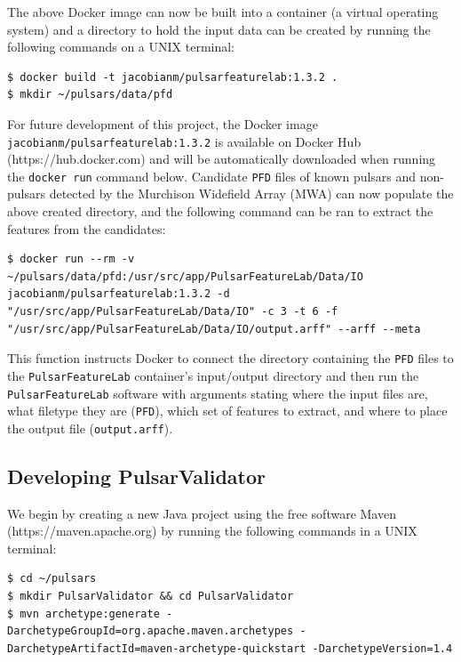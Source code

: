 \documentclass{article}
\begin{document}
\begin{appendices}
\begin{subappendices}
        The above Docker image can now be built into a container (a virtual operating system) and a directory to hold the input data can be created by running the following commands on a UNIX terminal:

        \begin{lstlisting}[numbers=none]
$ docker build -t jacobianm/pulsarfeaturelab:1.3.2 .
$ mkdir ~/pulsars/data/pfd
        \end{lstlisting}

        For future development of this project, the Docker image \\\verb|jacobianm/pulsarfeaturelab:1.3.2| is available on Docker Hub\\(https://hub.docker.com) and will be automatically downloaded when running the \verb|docker run| command below. Candidate \verb|PFD| files of known pulsars and non-pulsars detected by the Murchison Widefield Array (MWA) can now populate the above created directory, and the following command can be ran to extract the features from the candidates:

        \begin{lstlisting}[numbers=none]
$ docker run --rm -v ~/pulsars/data/pfd:/usr/src/app/PulsarFeatureLab/Data/IO jacobianm/pulsarfeaturelab:1.3.2 -d "/usr/src/app/PulsarFeatureLab/Data/IO" -c 3 -t 6 -f "/usr/src/app/PulsarFeatureLab/Data/IO/output.arff" --arff --meta
        \end{lstlisting}

        This function instructs Docker to connect the directory containing the \verb|PFD| files to the \verb|PulsarFeatureLab| container's input/output directory and then run the \verb|PulsarFeatureLab| software with arguments stating where the input files are, what filetype they are (\verb|PFD|), which set of features to extract, and where to place the output file (\verb|output.arff|).

        \subsection{Developing PulsarValidator}
        \label{apndx:pulsarvalidator}
        We begin by creating a new Java project using the free software Maven (https://maven.apache.org) by running the following commands in a UNIX terminal:

        \begin{lstlisting}[numbers=none]
$ cd ~/pulsars
$ mkdir PulsarValidator && cd PulsarValidator
$ mvn archetype:generate -DarchetypeGroupId=org.apache.maven.archetypes -DarchetypeArtifactId=maven-archetype-quickstart -DarchetypeVersion=1.4
        \end{lstlisting}
        

\end{subappendices}
\end{appendices}
\end{document}
